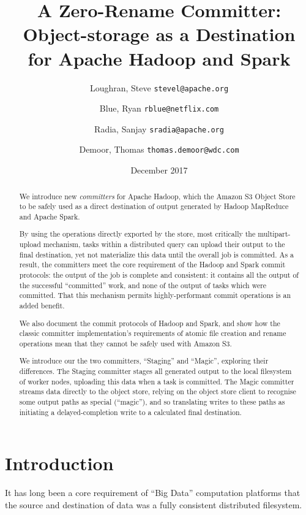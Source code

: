 \documentclass[conference]{IEEEtran}
\title{
A Zero-Rename Committer:\\
Object-storage as a Destination\\ for Apache Hadoop and Spark}
\author{
  Loughran, Steve
  \texttt{stevel@apache.org}\\
\and
  Blue, Ryan
  \texttt{rblue@netflix.com}\\
\and
  Radia, Sanjay
  \texttt{sradia@apache.org}
\and
  Demoor, Thomas
  \texttt{thomas.demoor@wdc.com}
}
\date{December 2017}
\begin{document}
\maketitle


\begin{abstract}

We introduce new \emph{committers} for Apache Hadoop, which
the Amazon S3 Object Store to be safely used as a direct destination of output generated
by Hadoop MapReduce and Apache Spark.

By using the operations directly exported by the store,
most critically the multipart-upload mechanism, tasks within a distributed
query can upload their output to the final destination,
yet not materialize this data until the overall job is committed.
As a result, the committers meet the core requirement of the Hadoop and Spark commit
protocols: the output of the job is complete and consistent: it contains
all the output of the successful ``committed'' work, and none of the output of
tasks which were committed.
That this mechanism permits highly-performant commit operations is an added benefit.

We also document the commit protocols of Hadoop and Spark, and show how the classic committer
implementation's requirements of atomic file creation and rename operations mean that they
cannot be safely used with Amazon S3.

We introduce our the two committers, ``Staging'' and ``Magic'', exploring their differences.
The Staging committer stages all generated output to the local filesystem of
worker nodes, uploading this data when a task is committed.
The Magic committer streams data directly to the object store, relying on the
object store client to recognise some output paths as special (``magic''), and
so translating writes to these paths as initiating a delayed-completion write
to a calculated final destination.

\end{abstract}


\section{Introduction}
\label{sec:introduction}

It has long been a core requirement of ``Big Data'' computation platforms that
the source and destination of data was a fully consistent distributed filesystem.
\end{document}
